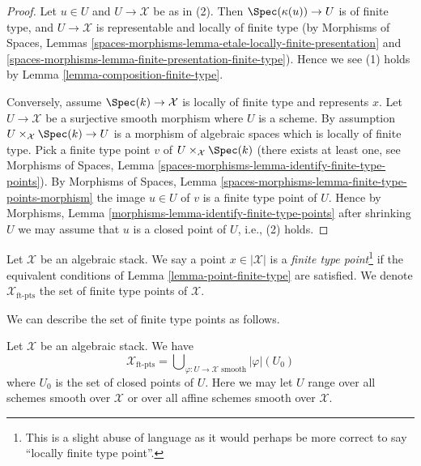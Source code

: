 \begin{proof}
Let $u \in U$ and $U \to \mathcal{X}$ be as in (2). Then
$\Spec(\kappa(u)) \to U$ is of finite type, and $U \to \mathcal{X}$ is
representable and locally of finite type (by
Morphisms of Spaces,
Lemmas \ref{spaces-morphisms-lemma-etale-locally-finite-presentation} and
\ref{spaces-morphisms-lemma-finite-presentation-finite-type}).
Hence we see (1) holds by
Lemma \ref{lemma-composition-finite-type}.

\medskip\noindent
Conversely, assume $\Spec(k) \to \mathcal{X}$ is locally of finite type
and represents $x$. Let $U \to \mathcal{X}$ be a surjective smooth morphism
where $U$ is a scheme. By assumption
$U \times_\mathcal{X} \Spec(k) \to U$ is a morphism of algebraic
spaces which is locally of finite type. Pick a finite type point $v$ of
$U \times_\mathcal{X} \Spec(k)$ (there exists at least one, see
Morphisms of Spaces,
Lemma \ref{spaces-morphisms-lemma-identify-finite-type-points}).
By
Morphisms of Spaces,
Lemma \ref{spaces-morphisms-lemma-finite-type-points-morphism}
the image $u \in U$ of $v$ is a finite type point of $U$.
Hence by
Morphisms, Lemma \ref{morphisms-lemma-identify-finite-type-points}
after shrinking $U$ we may assume that $u$ is a closed point of $U$, i.e.,
(2) holds.
\end{proof}

\begin{definition}
\label{definition-finite-type-point}
Let $\mathcal{X}$ be an algebraic stack. We say a point $x \in |\mathcal{X}|$
is a {\it finite type point}\footnote{This is a
slight abuse of language as it would perhaps be more correct to say
``locally finite type point''.} if the equivalent conditions of
Lemma \ref{lemma-point-finite-type}
are satisfied. We denote $\mathcal{X}_{\text{ft-pts}}$
the set of finite type points of $\mathcal{X}$.
\end{definition}

\noindent
We can describe the set of finite type points as follows.

\begin{lemma}
\label{lemma-identify-finite-type-points}
Let $\mathcal{X}$ be an algebraic stack. We have
$$
\mathcal{X}_{\text{ft-pts}} =
\bigcup\nolimits_{\varphi : U \to \mathcal{X}\text{ smooth}} |\varphi|(U_0)
$$
where $U_0$ is the set of closed points of $U$.
Here we may let $U$ range over all schemes smooth over $\mathcal{X}$
or over all affine schemes smooth over $\mathcal{X}$.
\end{lemma}

